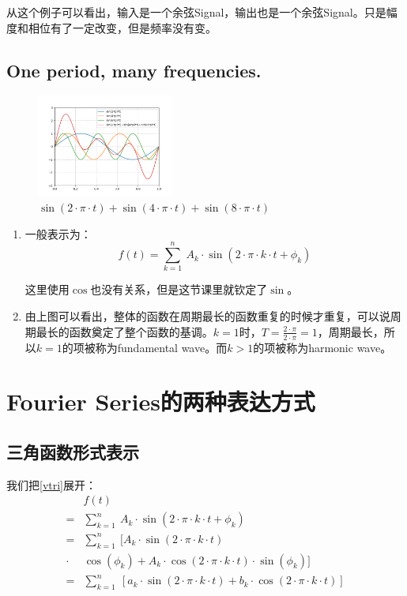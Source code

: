 从这个例子可以看出，输入是一个余弦Signal，输出也是一个余弦Signal。只是幅度和相位有了一定改变，但是频率没有变。
\subsection{One period, many frequencies.}
\begin{figure}[H]
	\centering
	\includegraphics[width=0.4\textwidth]{assets/Figure_1.png}
	\caption{$\sin(2\cdot\pi\cdot t)+\sin(4\cdot\pi\cdot t)+\sin(8\cdot\pi\cdot t)$}
\end{figure}
\begin{enumerate}
	\item 一般表示为：
	      \begin{equation}\label{vtri}
		      f(t)=\sum\limits_{k=1}^n\ A_k\cdot \sin(2\cdot \pi\cdot k\cdot t+\phi_k)
	      \end{equation}

	      这里使用$\cos$也没有关系，但是这节课里就钦定了$\sin$。
	\item 由上图可以看出，整体的函数在周期最长的函数重复的时候才重复，可以说周期最长的函数奠定了整个函数的基调。$k=1​$时，$T=\frac{2\cdot \pi}{2\cdot \pi}=1​$，周期最长，所以$k=1​$的项被称为fundamental wave。而$k>1​$的项被称为harmonic wave。
\end{enumerate}

\section{Fourier Series的两种表达方式}
\subsection{三角函数形式表示}
我们把\eqref{vtri}展开：
\begin{align*}
	      & f(t)                                                                                                   \\
	=     & \sum\limits_{k=1}^n\ A_k\cdot \sin(2\cdot\pi\cdot k\cdot t+\phi_k)                                     \\
	=     & \sum\limits_{k=1}^n\ [A_k\cdot \sin(2\cdot\pi\cdot k\cdot t)                                           \\
	\cdot & \cos(\phi_k)+A_k\cdot \cos(2\cdot \pi\cdot k\cdot t)\cdot \sin(\phi_k)]                                \\
	=     & \sum\limits_{k=1}^n\ [a_k\cdot \sin(2\cdot\pi\cdot k\cdot t) +b_k\cdot \cos(2\cdot \pi\cdot k\cdot t)]
\end{align*}

